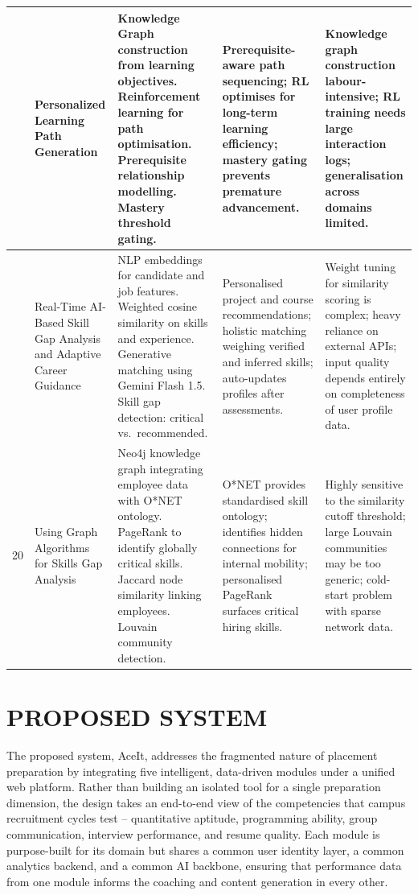 \documentclass[12pt,a4paper]{report}
\begin{document}
\begin{longtable}{|>{\centering\arraybackslash}p{0.6cm}|p{3.1cm}|p{3.6cm}|p{3.2cm}|p{3.2cm}|}
18 & Personalized Learning Path Generation \cite{ref18} &
Knowledge Graph construction from learning objectives. Reinforcement learning for path optimisation. Prerequisite relationship modelling. Mastery threshold gating. &
Prerequisite-aware path sequencing; RL optimises for long-term learning efficiency; mastery gating prevents premature advancement. &
Knowledge graph construction labour-intensive; RL training needs large interaction logs; generalisation across domains limited. \\
\hline

19 & Real-Time AI-Based Skill Gap Analysis and Adaptive Career Guidance \cite{ref19} &
NLP embeddings for candidate and job features. Weighted cosine similarity on skills and experience. Generative matching using Gemini Flash 1.5. Skill gap detection: critical vs.\ recommended. &
Personalised project and course recommendations; holistic matching weighing verified and inferred skills; auto-updates profiles after assessments. &
Weight tuning for similarity scoring is complex; heavy reliance on external APIs; input quality depends entirely on completeness of user profile data. \\
\hline

20 & Using Graph Algorithms for Skills Gap Analysis \cite{ref20} &
Neo4j knowledge graph integrating employee data with O*NET ontology. PageRank to identify globally critical skills. Jaccard node similarity linking employees. Louvain community detection. &
O*NET provides standardised skill ontology; identifies hidden connections for internal mobility; personalised PageRank surfaces critical hiring skills. &
Highly sensitive to the similarity cutoff threshold; large Louvain communities may be too generic; cold-start problem with sparse network data. \\
\hline

\end{longtable}
\endgroup

\chapter{PROPOSED SYSTEM}

The proposed system, AceIt, addresses the fragmented nature of placement preparation by integrating five intelligent, data-driven modules under a unified web platform. Rather than building an isolated tool for a single preparation dimension, the design takes an end-to-end view of the competencies that campus recruitment cycles test -- quantitative aptitude, programming ability, group communication, interview performance, and resume quality. Each module is purpose-built for its domain but shares a common user identity layer, a common analytics backend, and a common AI backbone, ensuring that performance data from one module informs the coaching and content generation in every other.
\end{document}

